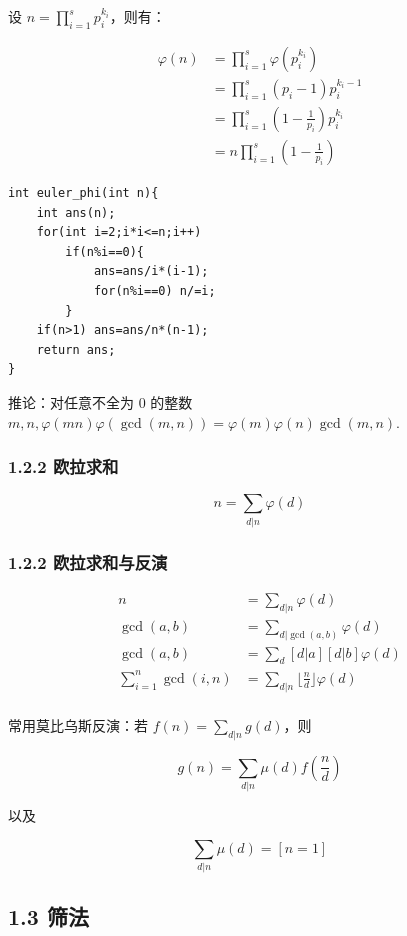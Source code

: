 \documentclass[UTF8,a4paper,11pt]{ctexart}
\begin{document}
设 $n=\prod^s_{i=1}p_i^{k_i}$，则有：

\[
\begin{aligned}
\varphi(n)&=\prod^s_{i=1}\varphi(p_i^{k_i})\\
    &=\prod^s_{i=1}(p_i-1)p_i^{k_i-1}\\
    &=\prod^s_{i=1}(1-\frac{1}{p_i})p_i^{k_i}\\
    &=n\prod^s_{i=1}(1-\frac{1}{p_i})
\end{aligned}
\]

\begin{Verbatim}[fontsize=\small,frame=single,breaklines=true,breakanywhere=true]
int euler_phi(int n){
    int ans(n);
    for(int i=2;i*i<=n;i++)
        if(n%i==0){
            ans=ans/i*(i-1);
            for(n%i==0) n/=i;
        }
    if(n>1) ans=ans/n*(n-1);
    return ans;
}
\end{Verbatim}
推论：对任意不全为 $0$ 的整数 $m,n,\varphi(mn)\varphi(\gcd(m,n))=\varphi(m)\varphi(n)\gcd(m,n)$.

\subsubsection*{1.2.2 欧拉求和}

\[
n=\sum_{d|n}\varphi(d)
\]

\subsubsection*{1.2.2 欧拉求和与反演}

\[
\begin{aligned}
n&=\sum_{d|n}\varphi(d)\\
\gcd(a,b)&=\sum_{d|\gcd(a,b)}\varphi(d)\\
\gcd(a,b)&=\sum_{d}[d|a][d|b]\varphi(d)\\
\sum_{i=1}^n \gcd(i,n)&=\sum_{d|n}\lfloor\frac{n}{d}\rfloor\varphi(d)\\
\end{aligned}
\]

常用莫比乌斯反演：若 $f(n)=\sum_{d|n}g(d)$，则

\[
g(n)=\sum_{d|n}\mu(d)f\left(\frac{n}{d}\right)
\]

以及

\[
\sum_{d|n}\mu(d)=[n=1]
\]

\subsection*{1.3 筛法}
\end{document}
